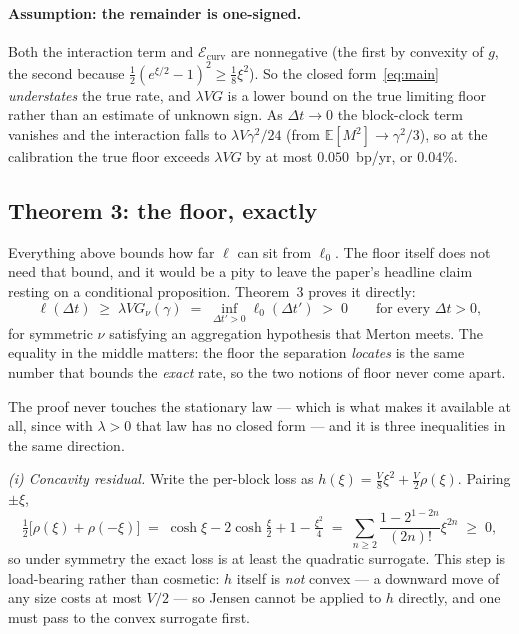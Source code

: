 \documentclass[11pt]{article}
\theoremstyle{definition}
\theoremstyle{remark}
\newcommand{\E}{\mathbb{E}}
\newcommand{\dt}{\Delta t}
\newcommand{\1}{\mathbf{1}}
\begin{document}
\paragraph{Assumption: the remainder is one-signed.} Both the interaction term and $\mathcal E_{\mathrm{curv}}$ are nonnegative (the first by convexity of $g$, the second because $\tfrac12(e^{\xi/2}-1)^2 \ge \tfrac18\xi^2$). So the closed form~\eqref{eq:main} \emph{understates} the true rate, and $\lambda VG$ is a lower bound on the true limiting floor rather than an estimate of unknown sign. As $\dt\to0$ the block-clock term vanishes and the interaction falls to $\lambda V\gamma^2/24$ (from $\E[M^2]\to\gamma^2/3$), so at the calibration the true floor exceeds $\lambda VG$ by at most $0.050$~bp/yr, or $0.04\%$.

\subsection{Theorem 3: the floor, exactly}\label{sec:exactfloor}

Everything above bounds how far $\ell$ can sit from $\ell_0$. The floor itself does not need that bound, and it would be a pity to leave the paper's headline claim resting on a conditional proposition. Theorem~3 proves it directly:
\[
\ell(\dt) \;\ge\; \lambda V G_\nu(\gamma) \;=\; \inf_{\dt'>0}\ell_0(\dt') \;>\; 0
\qquad\text{for every }\dt>0,
\]
for symmetric $\nu$ satisfying an aggregation hypothesis that Merton meets. The equality in the middle matters: the floor the separation \emph{locates} is the same number that bounds the \emph{exact} rate, so the two notions of floor never come apart.

The proof never touches the stationary law --- which is what makes it available at all, since with $\lambda>0$ that law has no closed form --- and it is three inequalities in the same direction.

\emph{(i) Concavity residual.} Write the per-block loss as $h(\xi) = \tfrac{V}{8}\xi^2 + \tfrac{V}{2}\rho(\xi)$. Pairing $\pm\xi$,
\[
\tfrac12\big[\rho(\xi)+\rho(-\xi)\big] \;=\; \cosh\xi - 2\cosh\tfrac\xi2 + 1 - \tfrac{\xi^2}{4} \;=\; \sum_{n\ge2}\frac{1-2^{1-2n}}{(2n)!}\xi^{2n} \;\ge\; 0,
\]
so under symmetry the exact loss is at least the quadratic surrogate. This step is load-bearing rather than cosmetic: $h$ itself is \emph{not} convex --- a downward move of any size costs at most $V/2$ --- so Jensen cannot be applied to $h$ directly, and one must pass to the convex surrogate first.
\end{document}
